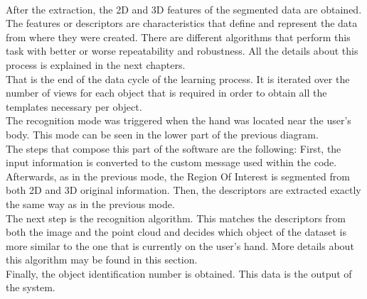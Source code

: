 \\

After the extraction, the 2D and 3D features of the segmented data are obtained. The features or descriptors are characteristics that define and represent the data from where they were created. There are different algorithms that perform this task with better or worse repeatability and robustness. All the details about this process is explained in the next chapters. 
\\

That is the end of the data cycle of the learning process. It is iterated over the number of views for each object that is required in order to obtain all the templates necessary per object. 
\\

The recognition mode was triggered when the hand was located near the user's body. This mode can be seen in the lower part of the previous diagram. 
\\

The steps that compose this part of the software are the following: 
First, the input information is converted to the custom message used within the code. Afterwards, as in the previous mode, the Region Of Interest is segmented from both 2D and 3D original information. Then, the descriptors are extracted exactly the same way as in the previous mode. 
\\

The next step is the recognition algorithm. This matches the descriptors from both the image and the point cloud and decides which object of the dataset is more similar to the one that is currently on the user's hand. More details about this algorithm may be found in this section. 
\\

Finally, the object identification number is obtained. This data is the output of the system. 
